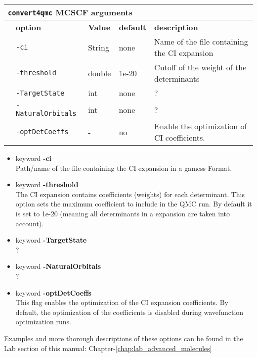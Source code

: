  \begin{table}[h]
 \begin{center}
 \begin{tabularx}{\textwidth}{l l l l l }
 \hline
 \multicolumn{5}{l}{\texttt{convert4qmc} MCSCF arguments} \\
 \hline
    &   \bfseries option      & \bfseries Value & \bfseries default   & \bfseries description \\
    &   \texttt{-ci    } & String     &   none & Name of the file containing the CI expansion  \\
    &   \texttt{-threshold         } &  double    &  1e-20 & Cutoff of the weight of the determinants  \\
    &   \texttt{-TargetState      } & int  &  none & ?  \\
    &   \texttt{-NaturalOrbitals      } &  int      &  none   & ?  \\
    &   \texttt{-optDetCoeffs      } &  -      &   no & Enable the optimization of CI coefficients. \\
    \hline
     \end{tabularx}
 \end{center}
 \end{table}
\begin{itemize}
\item keyword \textbf{-ci}\\
Path/name of the file containing the CI expansion in a gamess Format.
\item keyword \textbf{-threshold}\\
The CI expansion contains coefficients (weights) for each determinant. This option sets the maximum coefficient to include in the QMC run. By default it is set to 1e-20 (meaning all determinants in a expansion are taken into account).
\item keyword \textbf{-TargetState}\\
?
\item keyword \textbf{-NaturalOrbitals}\\
?
\item keyword \textbf{-optDetCoeffs}\\
This flag enables the optimization of the CI expansion coefficients. By default, the optimization of the coefficients is disabled during wavefunction optimization runs. 
\end{itemize}

Examples and more thorough descriptions of these options can be found in the Lab section of this manual: Chapter-\ref{chap:lab_advanced_molecules}\\

